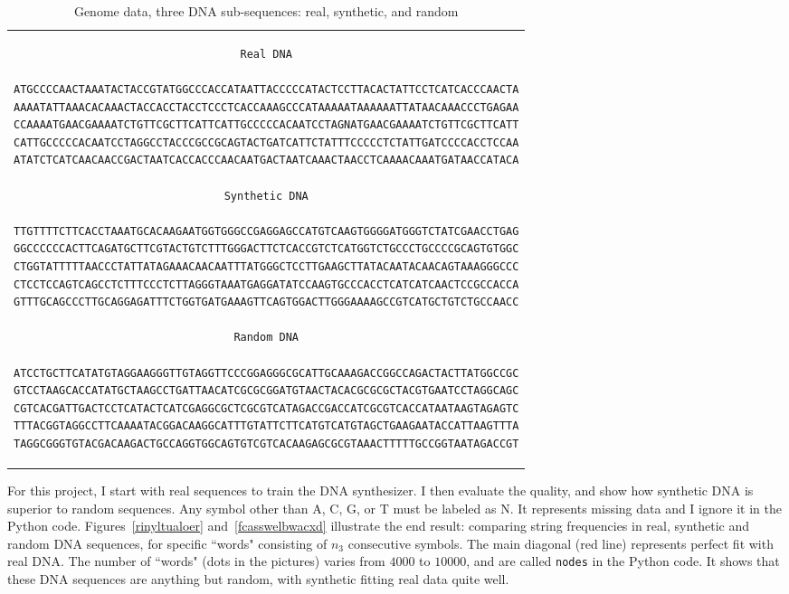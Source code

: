 \documentclass[oneside,10pt]{book}
\begin{document}
\begin{table}
\begin{center}
\begin{tabular}{c}
\begin{lstlisting}[frame=none]
Real DNA

ATGCCCCAACTAAATACTACCGTATGGCCCACCATAATTACCCCCATACTCCTTACACTATTCCTCATCACCCAACTA
AAAATATTAAACACAAACTACCACCTACCTCCCTCACCAAAGCCCATAAAAATAAAAAATTATAACAAACCCTGAGAA
CCAAAATGAACGAAAATCTGTTCGCTTCATTCATTGCCCCCACAATCCTAGNATGAACGAAAATCTGTTCGCTTCATT
CATTGCCCCCACAATCCTAGGCCTACCCGCCGCAGTACTGATCATTCTATTTCCCCCTCTATTGATCCCCACCTCCAA
ATATCTCATCAACAACCGACTAATCACCACCCAACAATGACTAATCAAACTAACCTCAAAACAAATGATAACCATACA

Synthetic DNA

TTGTTTTCTTCACCTAAATGCACAAGAATGGTGGGCCGAGGAGCCATGTCAAGTGGGGATGGGTCTATCGAACCTGAG
GGCCCCCCACTTCAGATGCTTCGTACTGTCTTTGGGACTTCTCACCGTCTCATGGTCTGCCCTGCCCCGCAGTGTGGC
CTGGTATTTTTAACCCTATTATAGAAACAACAATTTATGGGCTCCTTGAAGCTTATACAATACAACAGTAAAGGGCCC
CTCCTCCAGTCAGCCTCTTTCCCTCTTAGGGTAAATGAGGATATCCAAGTGCCCACCTCATCATCAACTCCGCCACCA
GTTTGCAGCCCTTGCAGGAGATTTCTGGTGATGAAAGTTCAGTGGACTTGGGAAAAGCCGTCATGCTGTCTGCCAACC

Random DNA

ATCCTGCTTCATATGTAGGAAGGGTTGTAGGTTCCCGGAGGGCGCATTGCAAAGACCGGCCAGACTACTTATGGCCGC
GTCCTAAGCACCATATGCTAAGCCTGATTAACATCGCGCGGATGTAACTACACGCGCGCTACGTGAATCCTAGGCAGC
CGTCACGATTGACTCCTCATACTCATCGAGGCGCTCGCGTCATAGACCGACCATCGCGTCACCATAATAAGTAGAGTC
TTTACGGTAGGCCTTCAAAATACGGACAAGGCATTTGTATTCTTCATGTCATGTAGCTGAAGAATACCATTAAGTTTA
TAGGCGGGTGTACGACAAGACTGCCAGGTGGCAGTGTCGTCACAAGAGCGCGTAAACTTTTTGCCGGTAATAGACCGT
\end{lstlisting}
\end{tabular}
\caption{\label{tafresa}Genome data, three DNA sub-sequences: real, synthetic, and random}
\end{center}
\end{table}
\vspace{1ex}

\noindent For this project, I start with real sequences to train the DNA synthesizer. I then evaluate the quality, and show how synthetic DNA  is superior to random sequences. Any symbol other than A, C, G, or T must be labeled as N. It represents missing data and I ignore it in the Python code. Figures~\ref{rinyltualoer} and~\ref{fcasswelbwacxd} illustrate the end result: comparing string frequencies
 in real, synthetic and random DNA sequences, for specific ``words" consisting of $n_3$ consecutive symbols. The main diagonal (red line) represents perfect fit  with real DNA. The number of ``words" (dots in the pictures) varies from $\num{4000}$ to $\num{10000}$, and are called
 \texttt{nodes} in the Python code. It shows that these DNA sequences are anything but random, with synthetic fitting real data quite well.
\end{document}
